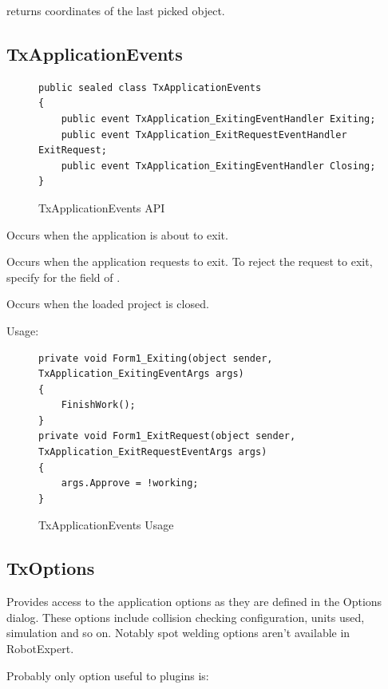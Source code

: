  returns coordinates of the last picked object.


\subsection{TxApplicationEvents}

\begin{figure}[H]
    \caption{TxApplicationEvents API}
    \centering
    \begin{verbatim}
public sealed class TxApplicationEvents
{
    public event TxApplication_ExitingEventHandler Exiting;
    public event TxApplication_ExitRequestEventHandler ExitRequest;
    public event TxApplication_ExitingEventHandler Closing;
}
    \end{verbatim}
    \label{fig:CodeTxApplicationEvents}
\end{figure}

 Occurs when the application is about to exit.

 Occurs when the application requests to exit.
To reject the request to exit, specify  for the  field of .

 Occurs when the loaded project is closed.

Usage:

\begin{figure}[H]
    \caption{TxApplicationEvents Usage}
    \centering
    \begin{verbatim}
private void Form1_Exiting(object sender, TxApplication_ExitingEventArgs args)
{
    FinishWork();
}
private void Form1_ExitRequest(object sender, TxApplication_ExitRequestEventArgs args)
{
    args.Approve = !working;
}
    \end{verbatim}
    \label{fig:CodeTxApplicationEventsUsage}
\end{figure}

\subsection{TxOptions}

Provides access to the application options as they are defined in the Options dialog.
These options include collision checking configuration, units used, simulation and so on.
Notably spot welding options aren't available in RobotExpert. 

Probably only option useful to plugins is:

